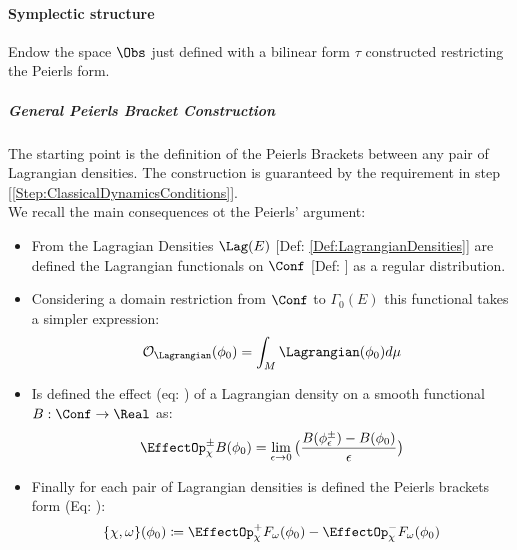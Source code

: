 \documentclass[Main]{subfiles}
\begin{document}
		\paragraph{Symplectic structure}
			Endow the space $\Obs$ just defined with a bilinear form $\tau$ constructed restricting the Peierls form.
			\subparagraph{General Peierls Bracket Construction}
			The starting point is the definition of the Peierls Brackets between any pair of Lagrangian densities.
			The construction is guaranteed by the requirement in step [\ref{Step:ClassicalDynamicsConditions}].\\
				We recall the main consequences  ot the Peierls' argument:
				\begin{itemize}
					\item From the Lagragian Densities $\Lag(E)$ [Def: \ref{Def:LagrangianDensities}] are defined the Lagrangian functionals on $\Conf$ [Def: \label{Def:LagrangianFunctionals}] as a regular distribution.
					\item Considering a domain restriction from $\Conf$ to $\Gamma_0(E)$  this functional takes a simpler expression:
					\begin{displaymath}
						\mathcal{O}_\Lagrangian( \phi_0) = \int_M \Lagrangian(\phi_0) d\mu
					\end{displaymath}
					\item Is defined the effect (eq: \label{EffectOperator}) of a Lagrangian density  on a smooth functional $B: \Conf \rightarrow \Real$ as:
						\begin{displaymath}
							\EffectOp_\chi^\pm B (\phi_0) = \lim_{\epsilon\rightarrow 0} \big( \frac{B(\phi_\epsilon^\pm) - B (\phi_0)} {\epsilon} \big)
						\end{displaymath}
					\item Finally for each pair of Lagrangian densities is defined the Peierls brackets form (Eq: \label{AbstractPeierlsBracket}):
						\begin{displaymath}
							\{\chi, \omega \}(\phi_0) \coloneqq \EffectOp_\chi^+ F_\omega (\phi_0) - \EffectOp_\chi^- F_\omega(\phi_0)
						\end{displaymath}
				\end{itemize}				 
		
\end{document}
